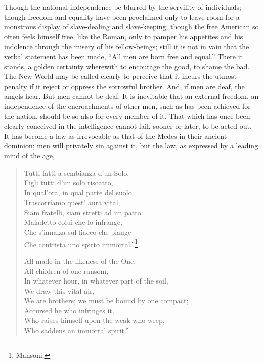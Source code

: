 Though the national independence be blurred by the servility of
individuals; though freedom and equality have been proclaimed only to
leave room for a monstrous display of slave-dealing and slave-keeping;
though the  free American so often feels himself free, like
the Roman, only to pamper his appetites and his indolence through the
misery of his fellow-beings; still it is not in vain that the verbal
statement has been made, ``All men are born free and equal.'' There it
stands, a golden certainty wherewith to encourage the good, to shame
the bad. The New World may be called clearly to perceive that it
incurs the utmost penalty if it reject or oppress the sorrowful
brother. And, if men are deaf, the angels hear. But men cannot be
deaf. It is inevitable that an external freedom, an independence of
the encroachments of other men, such as has been achieved for the
nation, should be so also for every member of it. That which has once
been clearly conceived in the intelligence cannot fail, sooner or
later, to be acted out. It has become a law as irrevocable as that of
the Medes in their ancient dominion; men will privately sin against
it, but the law, as expressed by a leading mind of the age,

\begin{verse}
Tutti fatti a sembianza d'un Solo,\\
Figli tutti d'un solo risoatto,\\
In qual'ora, in qual parte del suolo\\
Trascorriamo quest' aura vital,\\
Siam fratelli, siam stretti ad un patto:\\
Maladetto colui che lo infrange,\\
Che s'innalza sul fiacco che piange\\
Che contrista uno spirto immortal.''\footnote{Mansoni.}

All made in the likeness of the One,\\
\vin All children of one ransom,\\
In whatever hour, in whatever part of the soil,\\
\vin We draw this vital air,\\
We are brothers; we must be bound by one compact;\\
\vin Accursed he who infringes it,\\
Who raises himself upon the weak who weep,\\
\vin Who saddens an immortal spirit.''
\end{verse}

